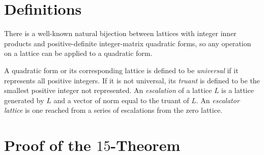 \documentclass[letterpaper, 12pt]{article}
\begin{document}
\section{Definitions}
There is a well-known natural bijection between lattices with integer inner products and positive-definite integer-matrix quadratic forms, so any operation on a lattice can be applied to a quadratic form.

A quadratic form or its corresponding lattice is defined to be \emph{universal} if it represents all positive integers. If it is not universal, its \emph{truant} is defined to be the smallest positive integer not represented. An \emph{escalation} of a lattice $L$ is a lattice generated by $L$ and a vector of norm equal to the truant of $L$. An \emph{escalator lattice} is one reached from a series of escalations from the zero lattice.

\section{Proof of the $15$-Theorem}
\end{document}
